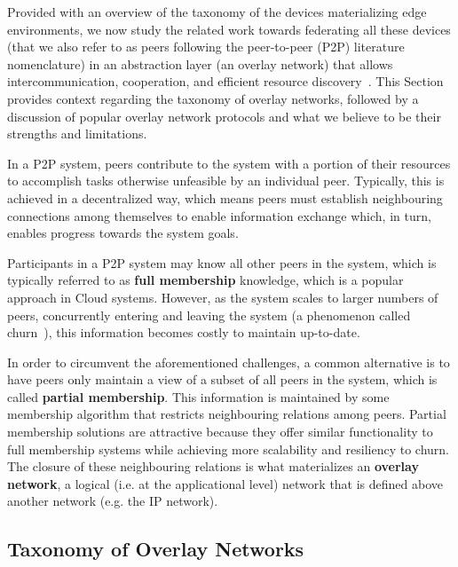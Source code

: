 



Provided with an overview of the taxonomy of the devices materializing edge environments, we now study the related work towards federating all these devices (that we also refer to as peers following the peer-to-peer (P2P) literature nomenclature) in an abstraction layer (an overlay network) that allows intercommunication, cooperation, and efficient resource discovery~\cite{leitaoPHDthesis}. This Section provides context regarding the taxonomy of overlay networks, followed by a discussion of popular overlay network protocols and what we believe to be their strengths and limitations.

In a P2P system, peers contribute to the system with a portion of their resources to accomplish tasks otherwise unfeasible by an individual peer. Typically, this is achieved in a decentralized way, which means peers must establish neighbouring connections among themselves to enable information exchange which, in turn, enables progress towards the system goals. 

Participants in a P2P system may know all other peers in the system, which is typically referred to as \textbf{full membership} knowledge, which is a popular approach in Cloud systems. However, as the system scales to larger numbers of peers, concurrently entering and leaving the system (a phenomenon called churn~\cite{stutzbach2006understanding}), this information becomes costly to maintain up-to-date. 

In order to circumvent the aforementioned challenges, a common alternative is to have peers only maintain a view of a subset of all peers in the system, which is called \textbf{partial membership}. This information is maintained by some membership algorithm that restricts neighbouring relations among peers. Partial membership solutions are attractive because they offer similar functionality to full membership systems while achieving more scalability and resiliency to churn. The closure of these neighbouring relations is what materializes an \textbf{overlay network}, a logical (i.e. at the applicational level) network that is defined above another network (e.g. the IP network).

\subsection{Taxonomy of Overlay Networks}

